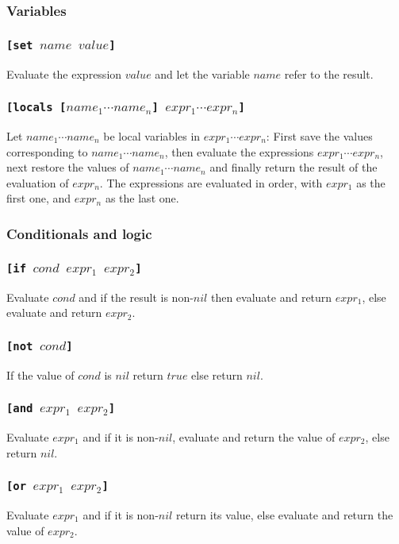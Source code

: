 \documentclass[11pt]{report}
\begin{document}
\subsubsection{Variables}
\subsubsection*{\tt{[set }$name$ $value$\tt{]}}
Evaluate the expression $value$ and let the variable $name$ refer to the result.

\subsubsection*{\tt{[locals [}$name_1 \cdots name_n$\tt{]} $expr_1 \cdots expr_n$\tt{]}}
Let $name_1 \cdots name_n$ be local variables in $expr_1 \cdots expr_n$: First save the values corresponding to $name_1 \cdots name_n$, then evaluate the expressions $expr_1 \cdots expr_n$, next restore the values of $name_1 \cdots name_n$ and finally return the result of the evaluation of $expr_n$. The expressions are evaluated in order, with $expr_1$ as the first one, and $expr_n$ as the last one.

\subsubsection{Conditionals and logic}
\subsubsection*{\tt{[if }$cond$ $expr_1$ $expr_2$\tt{]}}
Evaluate $cond$ and if the result is non-$nil$ then evaluate and return $expr_1$, else evaluate and return $expr_2$.

\subsubsection*{\tt{[not }$cond$\tt{]}}
If the value of $cond$ is $nil$ return $true$ else return $nil$.

\subsubsection*{\tt{[and }$expr_1$ $expr_2$\tt{]}}
Evaluate $expr_1$ and if it is non-$nil$, evaluate and return the value of $expr_2$, else return $nil$.

\subsubsection*{\tt{[or }$expr_1$ $expr_2$\tt{]}}
Evaluate $expr_1$ and if it is non-$nil$ return its value, else evaluate and return the value of $expr_2$.
\end{document}
